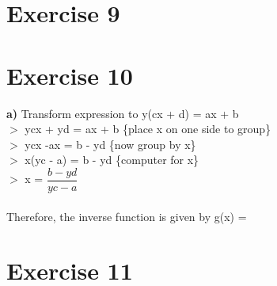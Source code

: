 \documentclass{article}
\begin{document}
  \section*{Exercise 9}
  \section*{Exercise 10}
  \textbf{a)} Transform expression to y(cx + d) = ax + b \\
  $>$ ycx + yd = ax + b \{place x on one side to group\} \\ 
  $>$ ycx -ax = b - yd  \{now group by x\} \\
  $>$ x(yc - a) = b - yd \{computer for x\} \\
  $>$ x = $\dfrac{b-yd}{yc-a}$ \\ \\
  Therefore, the inverse function is given by g(x) =  
  
  
  \section*{Exercise 11}
  
  
\end{document}
